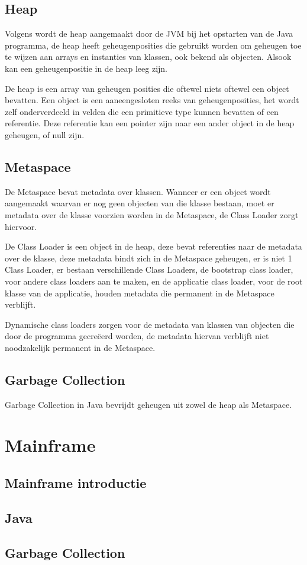     \subsection{Heap}
    \label{sec:heap}
    Volgens \textcite{Grgic2018} wordt de heap aangemaakt door de JVM bij het opstarten van de Java programma, de heap heeft geheugenposities die gebruikt worden om geheugen toe te wijzen aan arrays en instanties van klassen, ook bekend als objecten.
    Alsook kan een geheugenpositie in de heap leeg zijn.
    
    De heap is een array van geheugen posities die oftewel niets oftewel een object bevatten.
    Een object is een aaneengesloten reeks van geheugenposities, het wordt zelf onderverdeeld in velden die een primitieve type kunnen bevatten of een referentie.
    Deze referentie kan een pointer zijn naar een ander object in de heap geheugen, of null zijn.\autocite{Bruno2018}
    \subsection{Metaspace}
    \label{sec:Metaspace}
    De Metaspace bevat metadata over klassen.
    Wanneer er een object wordt aangemaakt waarvan er nog geen objecten van die klasse bestaan, moet er metadata over de klasse voorzien worden in de Metaspace, de Class Loader zorgt hiervoor.
    
    De Class Loader is een object in de heap, deze bevat referenties naar de metadata over de klasse, deze metadata bindt zich in de Metaspace geheugen, er is niet 1 Class Loader, er bestaan verschillende Class Loaders, de bootstrap class loader, voor andere class loaders aan te maken, en de applicatie class loader, voor de root klasse van de applicatie, houden metadata die permanent in de Metaspace verblijft.
    
    Dynamische class loaders zorgen voor de metadata van klassen van objecten die door de programma gecreëerd worden, de metadata hiervan verblijft niet noodzakelijk permanent in de Metaspace.
    \autocite{Putten2022}
    \subsection{Garbage Collection}
    \label{sec:garbage collection}
    Garbage Collection in Java bevrijdt geheugen uit zowel de heap als Metaspace.
\section{Mainframe}
\label{sec:mainframe}
    \subsection{Mainframe introductie}
    \label{sec:mainframe introductie}
    \subsection{Java}
    \label{sec:mainframe java}
    \subsection{Garbage Collection}
    \label{sec:mainframe garbage collection}
